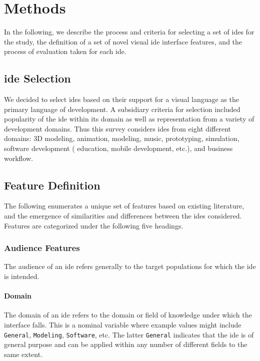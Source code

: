 \section{Methods} \label{sec:methods}

In the following, we describe the process and criteria for selecting a set of \acp{ide} for the study, the definition of a set of novel visual \ac{ide} interface features, and the process of evaluation taken for each \ac{ide}.


\subsection{\acs{ide} Selection} \label{subsec:ideselection}

We decided to select \acp{ide} based on their support for a visual language
as the primary language of development.  A subsidiary criteria for
selection included popularity of the \ac{ide} within its domain as well as
representation from a variety of development domains.  Thus this survey
considers \acp{ide} from eight different domains: 3D modeling, animation,
modeling, music, prototyping, simulation, software development (\eg
education, mobile development, etc.), and business workflow.


\subsection{Feature Definition} \label{subsec:featuredefinition}

The following enumerates a unique set of features based on existing literature, and the emergence of similarities and differences between the \acp{ide} considered.
Features are categorized under the following five headings.


\subsubsection{Audience Features} \label{subsubsec:audience}

The audience of an \ac{ide} refers generally to the target populations for which
the \ac{ide} is intended.


\paragraph{Domain}
The domain of an \ac{ide} refers to the domain or field of
knowledge under which the interface falls.
This is a nominal variable where example values might include \texttt{General}, \texttt{Modeling}, \texttt{Software}, etc.
The latter \texttt{General} indicates that the \ac{ide} is of general purpose and can be applied within any number of different fields to the same extent.


